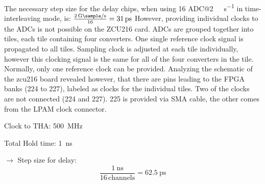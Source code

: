 The necessary step size for the delay chips, when using 16 ADC@\SI{2}{\giga \sample \per \second} in time-interleaving mode, is: $\frac{\SI{2}{\giga \sample \per \second}}{16} = \SI{31}{\pico \second}$
However, providing individual clocks to the ADCs is not possible on the ZCU216 card. ADCs are grouped together into tiles, each tile containing four converters. One single reference clock signal is propagated to all tiles. Sampling clock is adjusted at each tile individually, however this clocking signal is the same for all of the four converters in the tile. Normally, only one reference clock can be provided. Analyzing the schematic of the zcu216 board revealed however, that there are pins leading to the FPGA banks (224 to 227), labeled as clocks for the individual tiles. Two of the clocks are not connected (224 and 227). 225 is provided via SMA cable, the other comes from the LPAM clock connector.  

Clock to THA: \SI{500}{\mega \hertz}

Total Hold time: \SI{1}{\nano \second}

$\rightarrow$ Step size for delay:
\begin{equation}
	\frac{\SI{1}{\nano \second}}{16 \, \text{channels}} = \SI{62.5}{\pico \second}
\end{equation}

